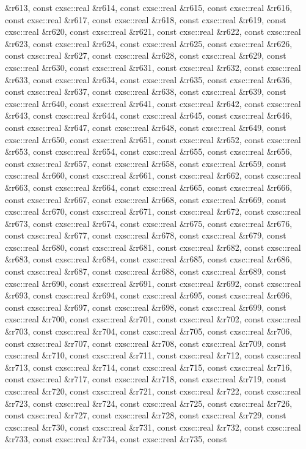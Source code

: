 \begin{DoxyCompactItemize}
\&r613, const cxsc\-::real \&r614, const cxsc\-::real \&r615, const cxsc\-::real \&r616, const cxsc\-::real \&r617, const cxsc\-::real \&r618, const cxsc\-::real \&r619, const cxsc\-::real \&r620, const cxsc\-::real \&r621, const cxsc\-::real \&r622, const cxsc\-::real \&r623, const cxsc\-::real \&r624, const cxsc\-::real \&r625, const cxsc\-::real \&r626, const cxsc\-::real \&r627, const cxsc\-::real \&r628, const cxsc\-::real \&r629, const cxsc\-::real \&r630, const cxsc\-::real \&r631, const cxsc\-::real \&r632, const cxsc\-::real \&r633, const cxsc\-::real \&r634, const cxsc\-::real \&r635, const cxsc\-::real \&r636, const cxsc\-::real \&r637, const cxsc\-::real \&r638, const cxsc\-::real \&r639, const cxsc\-::real \&r640, const cxsc\-::real \&r641, const cxsc\-::real \&r642, const cxsc\-::real \&r643, const cxsc\-::real \&r644, const cxsc\-::real \&r645, const cxsc\-::real \&r646, const cxsc\-::real \&r647, const cxsc\-::real \&r648, const cxsc\-::real \&r649, const cxsc\-::real \&r650, const cxsc\-::real \&r651, const cxsc\-::real \&r652, const cxsc\-::real \&r653, const cxsc\-::real \&r654, const cxsc\-::real \&r655, const cxsc\-::real \&r656, const cxsc\-::real \&r657, const cxsc\-::real \&r658, const cxsc\-::real \&r659, const cxsc\-::real \&r660, const cxsc\-::real \&r661, const cxsc\-::real \&r662, const cxsc\-::real \&r663, const cxsc\-::real \&r664, const cxsc\-::real \&r665, const cxsc\-::real \&r666, const cxsc\-::real \&r667, const cxsc\-::real \&r668, const cxsc\-::real \&r669, const cxsc\-::real \&r670, const cxsc\-::real \&r671, const cxsc\-::real \&r672, const cxsc\-::real \&r673, const cxsc\-::real \&r674, const cxsc\-::real \&r675, const cxsc\-::real \&r676, const cxsc\-::real \&r677, const cxsc\-::real \&r678, const cxsc\-::real \&r679, const cxsc\-::real \&r680, const cxsc\-::real \&r681, const cxsc\-::real \&r682, const cxsc\-::real \&r683, const cxsc\-::real \&r684, const cxsc\-::real \&r685, const cxsc\-::real \&r686, const cxsc\-::real \&r687, const cxsc\-::real \&r688, const cxsc\-::real \&r689, const cxsc\-::real \&r690, const cxsc\-::real \&r691, const cxsc\-::real \&r692, const cxsc\-::real \&r693, const cxsc\-::real \&r694, const cxsc\-::real \&r695, const cxsc\-::real \&r696, const cxsc\-::real \&r697, const cxsc\-::real \&r698, const cxsc\-::real \&r699, const cxsc\-::real \&r700, const cxsc\-::real \&r701, const cxsc\-::real \&r702, const cxsc\-::real \&r703, const cxsc\-::real \&r704, const cxsc\-::real \&r705, const cxsc\-::real \&r706, const cxsc\-::real \&r707, const cxsc\-::real \&r708, const cxsc\-::real \&r709, const cxsc\-::real \&r710, const cxsc\-::real \&r711, const cxsc\-::real \&r712, const cxsc\-::real \&r713, const cxsc\-::real \&r714, const cxsc\-::real \&r715, const cxsc\-::real \&r716, const cxsc\-::real \&r717, const cxsc\-::real \&r718, const cxsc\-::real \&r719, const cxsc\-::real \&r720, const cxsc\-::real \&r721, const cxsc\-::real \&r722, const cxsc\-::real \&r723, const cxsc\-::real \&r724, const cxsc\-::real \&r725, const cxsc\-::real \&r726, const cxsc\-::real \&r727, const cxsc\-::real \&r728, const cxsc\-::real \&r729, const cxsc\-::real \&r730, const cxsc\-::real \&r731, const cxsc\-::real \&r732, const cxsc\-::real \&r733, const cxsc\-::real \&r734, const cxsc\-::real \&r735, const 
\end{DoxyCompactItemize}
